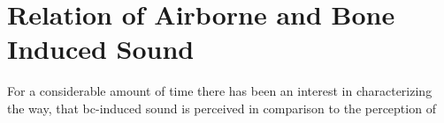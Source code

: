 \section{Relation of Airborne and Bone Induced Sound}
For a considerable amount of time there has been an interest in characterizing the way, that \gls{bc}-induced sound is perceived in comparison to the perception of  